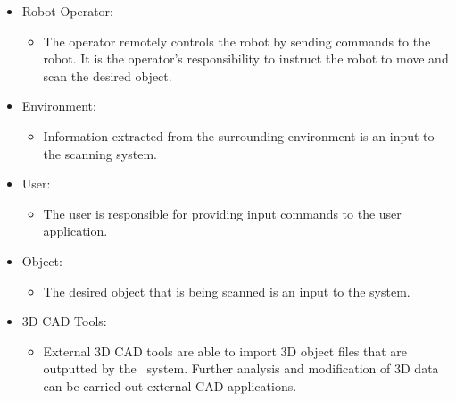 \documentclass[12pt]{article}
\begin{document}

\begin{itemize}
\item Robot Operator:
\begin{itemize}
\item The operator remotely controls the robot by sending commands to the robot. It is the operator's responsibility to instruct the robot to move and scan the desired object. 
\end{itemize}
\end{itemize}

\begin{itemize}
\item Environment:
\begin{itemize}
\item Information extracted from the surrounding environment is an input to the scanning system.
\end{itemize}
\end{itemize}

\begin{itemize}
\item User: 
\begin{itemize}
\item The user is responsible for providing input commands to the user application. 
\end{itemize}
\end{itemize}

\begin{itemize}
\item Object:
\begin{itemize}
\item The desired object that is being scanned is an input to the system.
\end{itemize}
\end{itemize}

\begin{itemize}
\item 3D CAD Tools:
\begin{itemize}
\item External 3D CAD tools are able to import 3D object files that are outputted by the \progname\ system. Further analysis and modification of 3D data can be carried out external CAD applications.
\end{itemize}
\end{itemize}
\end{document}

